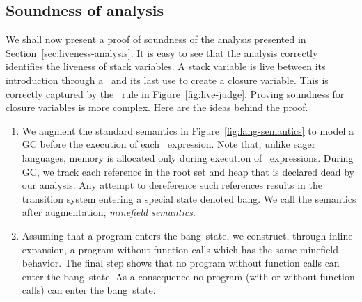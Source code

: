 \documentclass[9pt,preprint,letter,nonatbib]{sigplanconf}
\newcommand{\added}[1]{#1}
\newcommand{\bang}{\mbox{\sc bang}}
\begin{document}
\subsection{Soundness of analysis}  

We shall now present a proof of soundness of the analysis presented in
Section~\ref{sec:liveness-analysis}. \added{It is easy to see that the analysis
correctly identifies the liveness of stack variables. A stack variable
is live
between its introduction through a \LET\  and its last use to
create a closure variable. This is correctly captured by the
\LET\ rule in Figure~\ref{fig:live-judge}.}
Proving soundness  for closure  variables is more complex. Here  are the
ideas behind the proof. 
\begin{enumerate}
\item      We     augment      the      standard     semantics      in
  Figure~\ref{fig:lang-semantics} to  model a GC before  the execution
  of  each \LET\  expression.  \added{Note  that, unlike  eager
    languages,   memory  is   allocated  only   during  execution   of
    \LET\ expressions}. During GC, we track each reference in the root
  set and heap that is declared  dead by our analysis.  Any attempt to
  dereference  such  references  results   in  the  transition  system
  entering a special state denoted \bang.  We call the semantics after
  augmentation, \emph{minefield semantics}.

\item \label{inline1} Assuming that a program enters the \bang\ state,
  we  construct,  through  inline expansion,  a  program
  without function  calls which has  the same minefield  behavior. The
  final step shows that no program  without function calls can enter the
  \bang\ state. As a consequence  no program (with or without function
  calls) can enter the \bang\ state.
\end{enumerate}
\end{document}
